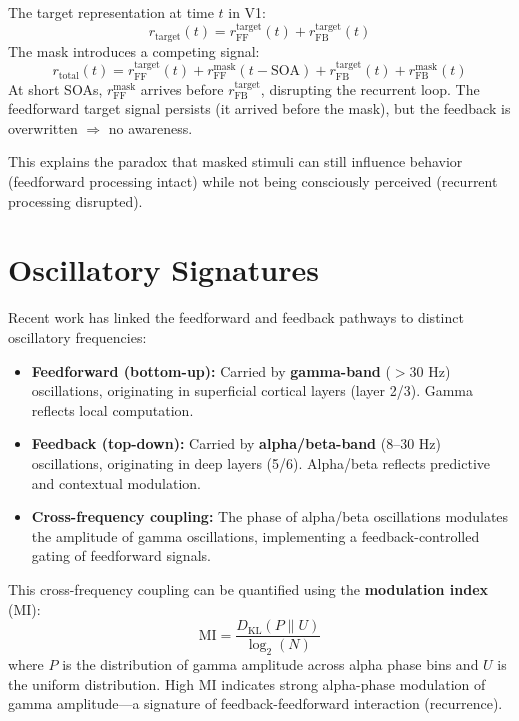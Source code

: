 \documentclass[11pt,a4paper]{report}
\begin{document}
\begin{mathbox}
\vspace{-6pt}
The target representation at time $t$ in V1:
\[
  r_{\text{target}}(t) = r_{\text{FF}}^{\text{target}}(t) + r_{\text{FB}}^{\text{target}}(t)
\]
The mask introduces a competing signal:
\[
  r_{\text{total}}(t) = r_{\text{FF}}^{\text{target}}(t) + r_{\text{FF}}^{\text{mask}}(t - \text{SOA}) + r_{\text{FB}}^{\text{target}}(t) + r_{\text{FB}}^{\text{mask}}(t)
\]
At short SOAs, $r_{\text{FF}}^{\text{mask}}$ arrives before $r_{\text{FB}}^{\text{target}}$, disrupting the recurrent loop. The feedforward target signal persists (it arrived before the mask), but the feedback is overwritten $\Rightarrow$ no awareness.
\vspace{-4pt}
\end{mathbox}

This explains the paradox that masked stimuli can still influence behavior (feedforward processing intact) while not being consciously perceived (recurrent processing disrupted).

\section{Oscillatory Signatures}

Recent work has linked the feedforward and feedback pathways to distinct oscillatory frequencies:

\begin{mechbox}
\begin{itemize}[leftmargin=1.5em]
  \item \textbf{Feedforward (bottom-up):} Carried by \textbf{gamma-band} ($>$30 Hz) oscillations, originating in superficial cortical layers (layer 2/3). Gamma reflects local computation.
  \item \textbf{Feedback (top-down):} Carried by \textbf{alpha/beta-band} (8--30 Hz) oscillations, originating in deep layers (5/6). Alpha/beta reflects predictive and contextual modulation.
  \item \textbf{Cross-frequency coupling:} The phase of alpha/beta oscillations modulates the amplitude of gamma oscillations, implementing a feedback-controlled gating of feedforward signals.
\end{itemize}
\end{mechbox}

This cross-frequency coupling can be quantified using the \textbf{modulation index} (MI):
\[
  \text{MI} = \frac{D_{\mathrm{KL}}(P \| U)}{\log_2(N)}
\]
where $P$ is the distribution of gamma amplitude across alpha phase bins and $U$ is the uniform distribution. High MI indicates strong alpha-phase modulation of gamma amplitude---a signature of feedback-feedforward interaction (recurrence).
\end{document}
